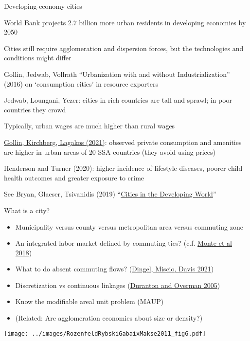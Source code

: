 \documentclass[11pt,notes=hide,aspectratio=169]{beamer}
\begin{document}
\begin{frame}{Developing-economy cities}
\begin{itemize}{\small
\item World Bank projects 2.7 billion more urban residents in developing economies by 2050
\item Cities still require agglomeration and dispersion forces, but the technologies and conditions might differ
\item Gollin, Jedwab, Vollrath ``Urbanization with and without Industrialization'' (2016) on `consumption cities' in resource exporters
\item Jedwab, Loungani, Yezer: cities in rich countries are tall and sprawl; in poor countries they crowd
\item Typically, urban wages are much higher than rural wages
\item \href{https://doi.org/10.1016/j.jue.2020.103301}{Gollin, Kirchberg, Lagakos (2021)}: observed private consumption and amenities are higher in urban areas of 20 SSA countries (they avoid using prices)
\item Henderson and Turner (2020): higher incidence of lifestyle diseases, poorer child health outcomes and greater exposure to
crime
\item See Bryan, Glaeser, Tsivanidis (2019) ``\href{https://doi.org/10.1146/annurev-economics-080218-030303}{Cities in the Developing World}''
}\end{itemize}
\end{frame}
\begin{frame}{What is a city?}
\begin{itemize}
	\item Municipality versus county versus metropolitan area versus commuting zone
	\item An integrated labor market defined by commuting ties? (c.f. \href{https://www.aeaweb.org/articles?id=10.1257/aer.20151507}{Monte et al 2018})
	\item What to do absent commuting flows? (\href{https://doi.org/10.1016/j.jue.2019.05.005}{Dingel, Miscio, Davis 2021})
	\item Discretization vs continuous linkages (\href{https://ideas.repec.org/a/oup/restud/v72y2005i4p1077-1106.html}{Duranton and Overman 2005})
	\item Know the modifiable areal unit problem (MAUP)
	\item (Related: Are agglomeration economies about size or density?)
\end{itemize}
\hspace{1in}
\texttt{[image: ../images/RozenfeldRybskiGabaixMakse2011\_fig6.pdf]}
\end{frame}
\end{document}
